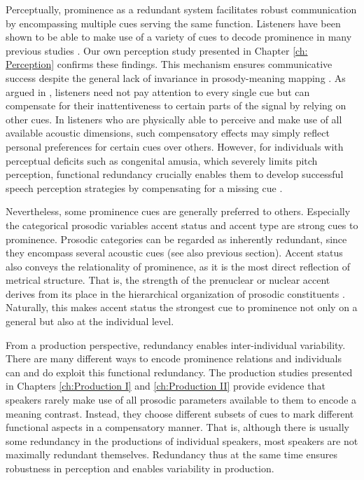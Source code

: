 Perceptually, prominence as a redundant system facilitates robust communication by encompassing multiple cues serving the same function. Listeners have been shown to be able to make use of a variety of cues to decode prominence in many previous studies \citep{turnbullProminencePerceptionDependent2017, baumannWhatMakesWord2018, coleSoundStructureMeaning2019, wagnerExploitingSpeechgestureLink2019}. Our own perception study presented in Chapter \ref{ch: Perception} confirms these findings. This mechanism ensures communicative success despite the general lack of invariance in prosody-meaning mapping \citep{winterSpokenLanguageAchieves2014}. As argued in \citet{baumannWhatMakesWord2018}, listeners need not pay attention to every single cue but can compensate for their inattentiveness to certain parts of the signal by relying on other cues. In listeners who are physically able to perceive and make use of all available acoustic dimensions, such compensatory effects may simply reflect personal preferences for certain cues over others. However, for individuals with perceptual deficits such as congenital amusia, which severely limits pitch perception, functional redundancy crucially enables them to develop successful speech perception strategies by compensating for a missing cue \citep{jasminTailoredPerceptionIndividuals2020}.

Nevertheless, some prominence cues are generally preferred to others. Especially the categorical prosodic variables accent status and accent type are strong cues to prominence. Prosodic categories can be regarded as inherently redundant, since they encompass several acoustic cues (see also previous section). Accent status also conveys the relationality of prominence, as it is the most direct reflection of metrical structure. That is, the strength of the prenuclear or nuclear accent derives from its place in the hierarchical organization of prosodic constituents \citep{laddIntonationalPhonology2008, calhounCentralityMetricalStructure2010}. Naturally, this makes accent status the strongest cue to prominence not only on a general but also at the individual level.

From a production perspective, redundancy enables inter-individual variability. There are many different ways to encode prominence relations and individuals can and do exploit this functional redundancy. The production studies presented in Chapters \ref{ch:Production I} and \ref{ch:Production II} provide evidence that speakers rarely make use of all prosodic parameters available to them to encode a meaning contrast. Instead, they choose different subsets of cues to mark different functional aspects in a compensatory manner. That is, although there is usually some redundancy in the productions of individual speakers, most speakers are not maximally redundant themselves. Redundancy thus at the same time ensures robustness in perception and enables variability in production.

